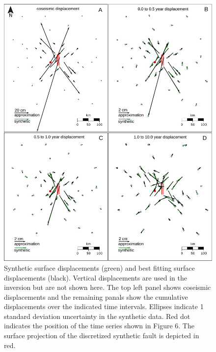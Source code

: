 \documentclass[extra]{gji}
\begin{document}
\begin{figure}\label{figure5}
  \centering
  \includegraphics[scale=0.6]{FinalFigures/Figure4.pdf}
  \caption{Synthetic surface displacements (green) and best fitting
    surface displacements (black).  Vertical displacements are used in
    the inversion but are not shown here.  The top left panel shows
    coseismic displacements and the remaining panals show the
    cumulative displacements over the indicated time
    intervals. Ellipses indicate 1 standard deviation uncertainty in
    the synthetic data. Red dot indicates the position of the time
    series shown in Figure 6. The surface projection of the
    discretized synthetic fault is depicted in red.}
  \label{Figure 5}
\end{figure}
\end{document}
